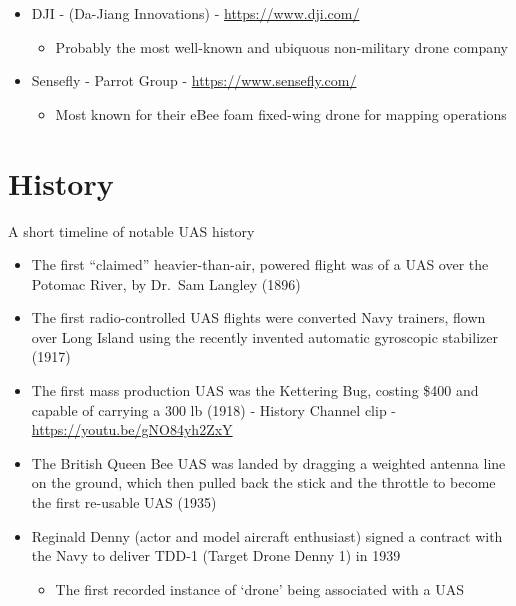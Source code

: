 \documentclass[
]{book}
\providecommand{\tightlist}{%
  \setlength{\itemsep}{0pt}\setlength{\parskip}{0pt}}
\theoremstyle{definition}
\theoremstyle{definition}
\theoremstyle{definition}
\theoremstyle{remark}
\begin{document}
\begin{itemize}
\tightlist
\item
  DJI - (Da-Jiang Innovations) - \url{https://www.dji.com/}

  \begin{itemize}
  \tightlist
  \item
    Probably the most well-known and ubiquous non-military drone company
  \end{itemize}
\item
  Sensefly - Parrot Group - \url{https://www.sensefly.com/}

  \begin{itemize}
  \tightlist
  \item
    Most known for their eBee foam fixed-wing drone for mapping operations
  \end{itemize}
\end{itemize}

\hypertarget{history}{%
\section{History}\label{history}}

A short timeline of notable UAS history

\begin{itemize}
\tightlist
\item
  The first ``claimed'' heavier-than-air, powered flight was of a UAS over the Potomac River, by Dr.~Sam Langley (1896)
\item
  The first radio-controlled UAS flights were converted Navy trainers, flown over Long Island using the recently invented automatic gyroscopic stabilizer (1917)
\item
  The first mass production UAS was the Kettering Bug, costing \$400 and capable of carrying a 300 lb (1918) - History Channel clip - \url{https://youtu.be/gNO84yh2ZxY}
\item
  The British Queen Bee UAS was landed by dragging a weighted antenna line on the ground, which then pulled back the stick and the throttle to become the first re-usable UAS (1935)
\item
  Reginald Denny (actor and model aircraft enthusiast) signed a contract with the Navy to deliver TDD-1 (Target Drone Denny 1) in 1939

  \begin{itemize}
  \tightlist
  \item
    The first recorded instance of `drone' being associated with a UAS
  \end{itemize}
\end{itemize}
\end{document}
